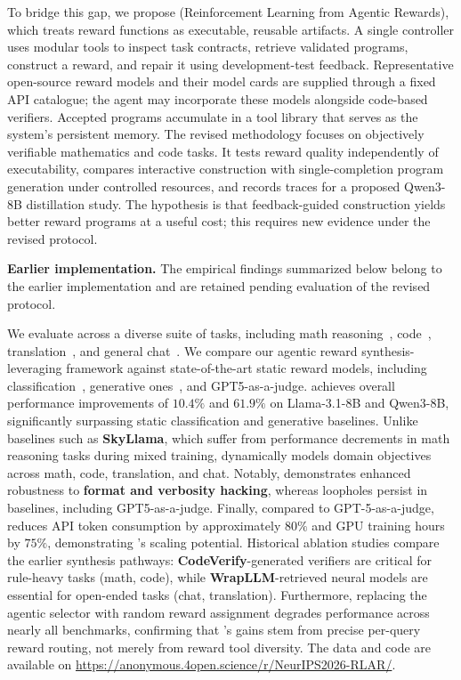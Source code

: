 To bridge this gap, we propose \textbf{\method{}} (Reinforcement Learning from Agentic Rewards), which treats reward functions as executable, reusable artifacts. A single controller uses modular tools to inspect task contracts, retrieve validated programs, construct a reward, and repair it using development-test feedback. Representative open-source reward models and their model cards are supplied through a fixed API catalogue; the agent may incorporate these models alongside code-based verifiers. Accepted programs accumulate in a tool library that serves as the system's persistent memory.
The revised methodology focuses on objectively verifiable mathematics and code tasks. It tests reward quality independently of executability, compares interactive construction with single-completion program generation under controlled resources, and records traces for a proposed Qwen3-8B distillation study. The hypothesis is that feedback-guided construction yields better reward programs at a useful cost; this requires new evidence under the revised protocol.

\noindent\textbf{Earlier implementation.} The empirical findings summarized below belong to the earlier implementation and are retained pending evaluation of the revised protocol.

We evaluate \method{} across a diverse suite of tasks, including math reasoning~\citep{hendrycks2021measuringmathematicalproblemsolving, gsm8k}, code~\citep{leetcodedataset, mbpp}, translation~\citep{benchmax, nllb2022, flores101, twoevaldatasets}, and general chat~\citep{ultrachat}.
We compare our agentic reward synthesis-leveraging framework against state-of-the-art static reward models, including classification~\citep{skyworkreward}, generative ones~\citep{skyworkcritic2024}, and GPT5-as-a-judge. 
\method{} achieves overall performance improvements of \(10.4\%\) and \(61.9\%\) on Llama-3.1-8B and Qwen3-8B, significantly surpassing static classification and generative baselines. 
Unlike baselines such as \textbf{SkyLlama}, which suffer from performance decrements in math reasoning tasks during mixed training, \method{} dynamically models domain objectives across math, code, translation, and chat. 
Notably, \method{} demonstrates enhanced robustness to \textbf{format and verbosity hacking}, whereas loopholes persist in baselines, including GPT5-as-a-judge.
Finally, compared to GPT-5-as-a-judge, \method{} reduces API token consumption by approximately \(80\%\) and GPU training hours by \(75\%\), demonstrating \method{}'s scaling potential.
Historical ablation studies compare the earlier synthesis pathways: \textbf{CodeVerify}-generated verifiers are critical for rule-heavy tasks (math, code), while \textbf{WrapLLM}-retrieved neural models are essential for open-ended tasks (chat, translation). Furthermore, replacing the agentic selector with random reward assignment degrades performance across nearly all benchmarks, confirming that \method{}'s gains stem from precise per-query reward routing, not merely from reward tool diversity.
The data and code are available on \url{https://anonymous.4open.science/r/NeurIPS2026-RLAR/}.



